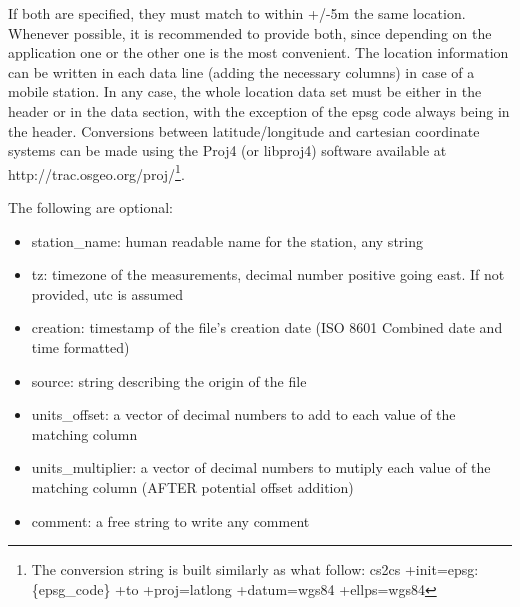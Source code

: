 \documentclass[a4paper,10pt]{article}
\begin{document}
If both are specified, they must match to within +/-5m the same location. Whenever possible, it is recommended to provide both, since depending on the application one or the other one is the most convenient. The location information can be written in each data line (adding the necessary columns) in case of a mobile station. In any case, the whole location data set must be either in the header or in the data section, with the exception of the epsg code always being in the header. Conversions between latitude/longitude and cartesian coordinate systems can be made using the Proj4 (or libproj4) software available at http://trac.osgeo.org/proj/\footnote{The conversion string is built similarly as what follow: cs2cs +init=epsg:\{epsg\_code\} +to +proj=latlong +datum=wgs84 +ellps=wgs84}.

The following are optional:
\begin{itemize}
	\item station\_name: human readable name for the station, any string
	\item tz: timezone of the measurements, decimal number positive going east. If not provided, utc is assumed
	\item creation: timestamp of the file's creation date (ISO 8601 Combined date and time formatted)
	\item source: string describing the origin of the file
	\item units\_offset: a vector of decimal numbers to add to each value of the matching column
	\item units\_multiplier: a vector of decimal numbers to mutiply each value of the matching column (AFTER potential offset addition)
	\item comment: a free string to write any comment
\end{itemize}
\end{document}
